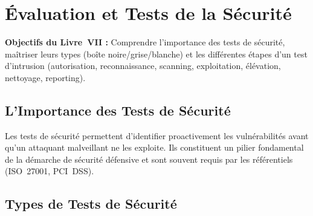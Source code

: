 
\chapter{Évaluation et Tests de la Sécurité}
\label{chap:tests_securite}

\begin{boxobjectifs}
\textbf{Objectifs du Livre~VII :} Comprendre l'importance des tests de sécurité, maîtriser leurs types (boîte noire/grise/blanche) et les différentes étapes d'un test d'intrusion (autorisation, reconnaissance, scanning, exploitation, élévation, nettoyage, reporting).
\end{boxobjectifs}

\section{L'Importance des Tests de Sécurité}

Les tests de sécurité permettent d'identifier proactivement les vulnérabilités avant qu'un attaquant malveillant ne les exploite. Ils constituent un pilier fondamental de la démarche de sécurité défensive et sont souvent requis par les référentiels (ISO~27001, PCI~DSS).

\section{Types de Tests de Sécurité}

